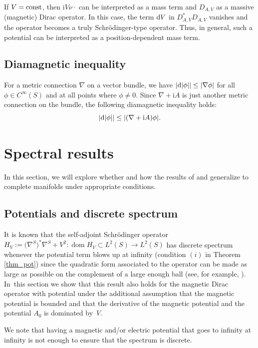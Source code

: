 \documentclass[10pt,a4paper]{amsart}
\numberwithin{equation}{section}
\begin{document}
\begin{Remark} If $V={\rm const}$, then ${\mathrm{i}}V\nu \cdot$ can be interpreted as a mass term and $D_{A,V}$ as a massive (magnetic) Dirac operator. In this case, the term ${\rm d}V$ in $D^*_{A,V}D_{A,V}$ vanishes and the operator becomes a truly Schr\"odinger-type operator. Thus, in general, such a potential can be interpreted as a position-dependent mass term.\end{Remark}

\subsection{Diamagnetic inequality}
For a metric connection $\nabla$ on a vector bundle, we have $|{\rm d}|\phi||\leq |\nabla \phi|$ for all $\phi\in C^\infty(S)$ and at all points where $\phi\neq 0$.
Since $\nabla +{\mathrm{i}}A$ is just another metric connection on the bundle, the following diamagnetic inequality holds:
\[ |{\rm d}|\phi||\leq |(\nabla + {\mathrm{i}}A )\phi|.\]


\section{Spectral results}
In this section, we will explore whether and how the results of \cite[Section~6]{CFKS} and \cite{Yamada} generalize to complete manifolds under appropriate conditions.

\subsection{Potentials and discrete spectrum}
It is known that the self-adjoint Schr\"odinger operator ${H}_V:= \bigl(\nabla^S\bigr)^*\nabla^S + V^2\colon \operatorname{dom}  H_V\subset L^2(S)\to L^2(S)$ has discrete spectrum whenever the potential term blows up at infinity (condition $(i)$ in Theorem \ref{thm_pot}) since the quadratic form associated to the operator can be made as large as possible on the complement of a large enough ball (see, for example, \cite[Theorem~XIII.16]{RS4}). In~this section we show that this result also holds for the magnetic Dirac operator with potential under the additional assumption that the magnetic potential is bounded and that the derivative of the magnetic potential and the potential $A_0$ is dominated by~$V$.

We note that having a magnetic and/or electric potential that goes to infinity at infinity is not enough to ensure that the spectrum is discrete.
\end{document}
